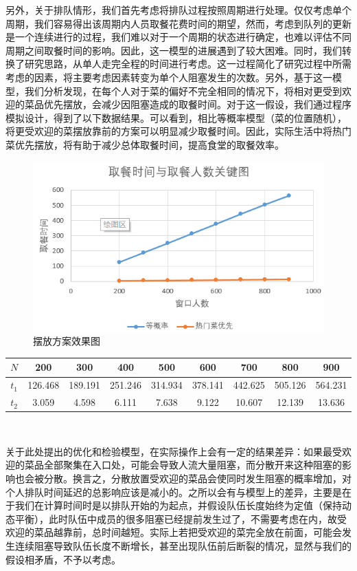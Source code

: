 \documentclass[lang=cn,10pt,a4paper]{elegantpaper}
\begin{document}
另外，关于排队情形，我们首先考虑将排队过程按照周期进行处理。仅仅考虑单个周期，我们容易得出该周期内人员取餐花费时间的期望，然而，考虑到队列的更新是一个连续进行的过程，我们难以对于一个周期的状态进行确定，也难以评估不同周期之间取餐时间的影响。因此，这一模型的进展遇到了较大困难。同时，我们转换了研究思路，从单人走完全程的时间进行考虑。这一过程简化了研究过程中所需考虑的因素，将主要考虑因素转变为单个人阻塞发生的次数。另外，基于这一模型，我们分析发现，在每个人对于菜的偏好不完全相同的情况下，将相对更受到欢迎的菜品优先摆放，会减少因阻塞造成的取餐时间。对于这一假设，我们通过程序模拟设计，得到了以下数据结果。可以看到，相比等概率模型（菜的位置随机），将更受欢迎的菜摆放靠前的方案可以明显减少取餐时间。因此，实际生活中将热门菜优先摆放，将有助于减少总体取餐时间，提高食堂的取餐效率。
\begin{figure}[htbp]
  \centering
  \includegraphics[scale=1]{./image/pic2.png}
  \caption{摆放方案效果图}
\end{figure}
\begin{center}
\begin{tabular}{|c|c|c|c|c|c|c|c|c|}
\hline
$N$&200&300&400&500&600&700&800&900\\
\hline
$t_1$&126.468&189.191&251.246&314.934&378.141&442.625&505.126&564.231\\
\hline
$t_2$&3.059&4.598&6.111&7.638&9.122&10.607&12.139&13.636\\
\hline
\end{tabular}\\
\end{center}

关于此处提出的优化和检验模型，在实际操作上会有一定的结果差异：如果最受欢迎的菜品全部聚集在入口处，可能会导致人流大量阻塞，而分散开来这种阻塞的影响也会被分散。换言之，分散放置受欢迎的菜品会使同时发生阻塞的概率增加，对个人排队时间延迟的总影响应该是减小的。之所以会有与模型上的差异，主要是在于我们在计算时间时是以排队开始的为起点，并假设队伍长度始终为定值（保持动态平衡），此时队伍中成员的很多阻塞已经提前发生过了，不需要考虑在内，故受欢迎的菜品越靠前，总时间越短。实际上若把受欢迎的菜完全放在前面，可能会发生连续阻塞导致队伍长度不断增长，甚至出现队伍前后断裂的情况，显然与我们的假设相矛盾，不予以考虑。
\end{document}

